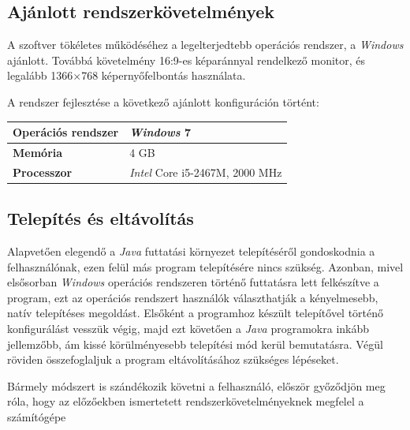 \documentclass{elteikthesis}
\begin{document}
\subsection{Ajánlott rendszerkövetelmények}
A szoftver tökéletes működéséhez a legelterjedtebb operációs rendszer, a \emph{Windows} ajánlott. Továbbá követelmény 16:9-es képaránnyal rendelkező monitor, és legalább 1366$\times$768 képernyőfelbontás használata.\par
A rendszer fejlesztése a következő ajánlott konfiguráción történt:
\begin{table}[h]
	\def\arraystretch{2}
	\centering
	\begin{tabular}{|l|l|}
		\hline
		\textbf{Operációs rendszer} & \emph{Windows} 7                     \\ \hline
		\textbf{Memória}            & 4 GB                          \\ \hline
		\textbf{Processzor}         & \emph{Intel} Core i5-2467M, 2000 MHz \\ \hline
	\end{tabular}
\end{table}

\subsection{Telepítés és eltávolítás}
Alapvetően elegendő a \emph{Java} futtatási környezet telepítéséről gondoskodnia a felhasználónak, ezen felül más program telepítésére nincs szükség. Azonban, mivel elsősorban \emph{Windows} operációs rendszeren történő futtatásra lett felkészítve a program, ezt az operációs rendszert használók választhatják a kényelmesebb, natív telepítéses megoldást. Elsőként a programhoz készült telepítővel történő konfigurálást vesszük végig, majd ezt követően a \emph{Java} programokra inkább jellemzőbb, ám kissé körülményesebb telepítési mód kerül bemutatásra. Végül röviden összefoglaljuk a program eltávolításához szükséges lépéseket.
\par Bármely módszert is szándékozik követni a felhasználó, először győződjön meg róla, hogy az előzőekben ismertetett rendszerkövetelményeknek megfelel a számítógépe
\end{document}
